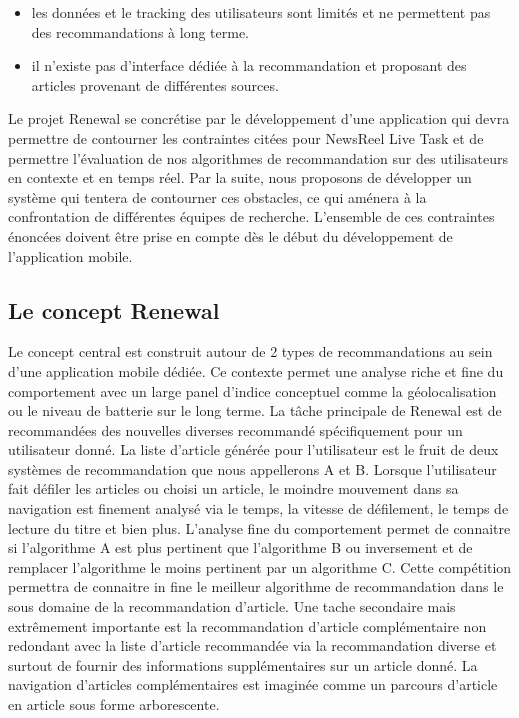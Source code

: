 \begin{itemize}
    \item les données et le tracking des utilisateurs sont limités et ne permettent pas des recommandations à long terme. 
    
    \item  il n’existe pas d’interface dédiée à la recommandation et proposant des articles provenant de différentes sources.

\end{itemize}

Le projet Renewal se concrétise par le développement d'une application qui devra permettre de contourner les contraintes citées pour NewsReel Live Task et de permettre l'évaluation de nos algorithmes de recommandation sur des utilisateurs en contexte et en temps réel. Par la suite, nous proposons de développer un système qui tentera de contourner ces obstacles, ce qui aménera à la confrontation de différentes équipes de recherche. L'ensemble de ces contraintes énoncées doivent être prise en compte dès le début du développement de l'application mobile.


\subsection{Le concept Renewal}

Le concept central est construit autour de 2 types de recommandations au sein d'une application mobile dédiée. Ce contexte permet une analyse riche et fine du comportement avec un large panel d’indice conceptuel comme la géolocalisation ou le niveau de batterie sur le long terme. La tâche principale de Renewal est de recommandées des nouvelles diverses recommandé spécifiquement pour un utilisateur donné. La liste d’article générée pour l’utilisateur est le fruit de deux systèmes de recommandation que nous appellerons A et B. Lorsque l’utilisateur fait défiler les articles ou choisi un article, le moindre mouvement dans sa navigation est finement analysé via le temps, la vitesse de défilement, le temps de lecture du titre et bien plus. L’analyse fine du comportement permet de connaitre si l’algorithme A est plus pertinent que l’algorithme B ou inversement et de remplacer l’algorithme le moins pertinent par un algorithme C. Cette compétition permettra de connaitre in fine le meilleur algorithme de recommandation dans le sous domaine de la recommandation d’article. Une tache secondaire mais extrêmement importante est la recommandation d’article complémentaire non redondant avec la liste d’article recommandée via la recommandation diverse et surtout de fournir des informations supplémentaires sur un article donné. La navigation d’articles complémentaires est imaginée comme un parcours d’article en article sous forme arborescente. 

